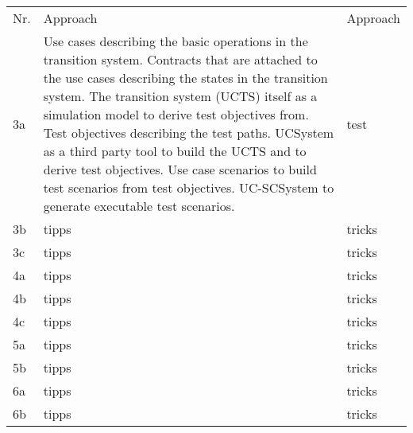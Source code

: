 \newpage

\begin{tabular}[h]{p{0.5cm}p{}p{}}
	Nr. & Approach \cite{ansatz.2006} & Approach \cite{ansatz.2007} \\
	3a & 
	Use cases describing the basic operations in the transition system. Contracts that are attached to the use cases describing the states in the transition system. The transition system (UCTS) itself as a simulation model to derive test objectives from. Test objectives describing the test paths. UCSystem as a third party tool to build the UCTS and to derive test objectives. Use case scenarios to build test scenarios from test objectives. UC-SCSystem to generate executable test scenarios.  & 
    test \\
	3b & tipps & tricks \\
	3c & tipps & tricks \\
	4a & tipps & tricks \\
	4b & tipps & tricks \\
	4c & tipps & tricks \\
	5a & tipps & tricks \\
	5b & tipps & tricks \\
	6a & tipps & tricks \\
	6b & tipps & tricks \\
\end{tabular}